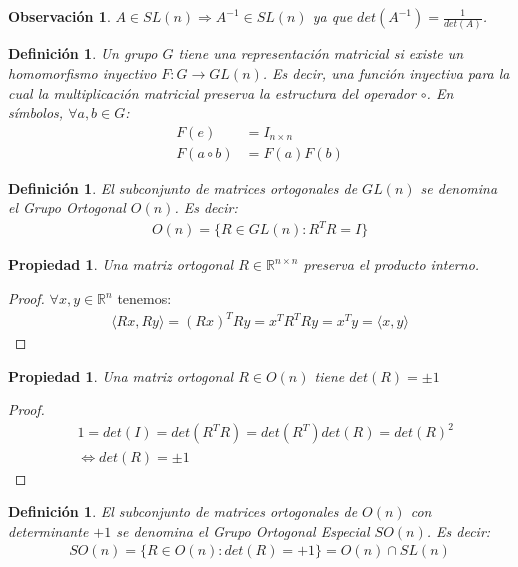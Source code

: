 \documentclass[ twoside,openright,titlepage,numbers=noenddot,%
                headinclude,footinclude,cleardoublepage=empty,abstract=on,
                BCOR=-5mm,paper=a4,fontsize=11pt
                ]{scrreprt}
\newtheorem{definition}[theorem]{Definición}
\newtheorem{remark}[theorem]{Observación}
\newtheorem{property}[theorem]{Propiedad}
\newcommand{\R}{\mathbb{R}}
\newcommand{\Rnn}{\R^{n \times n}}
\newcommand{\dotprod}[2]{\langle #1, #2 \rangle}
\begin{document}
\begin{remark}\(A \in SL(n) \Rightarrow A^{-1} \in SL(n)\) ya que
\(det(A^{-1}) = \frac{1}{det(A)}\).\end{remark}

\begin{definition}Un grupo \(G\) tiene una representación matricial si
existe un homomorfismo inyectivo \(F:G \rightarrow GL(n)\). Es decir,
una función inyectiva para la cual la multiplicación matricial preserva
la estructura del operador \(\circ\). En símbolos,
\(\forall a, b \in G\): \begin{align}
  F(e) &= I_{n \times n} \\
  F(a \circ b) &= F(a)F(b)
\end{align}\end{definition}

\begin{definition}El subconjunto de matrices ortogonales de \(GL(n)\) se
denomina el Grupo Ortogonal \(O(n)\). Es decir: \begin{align}
O(n) = \{ R \in GL(n) : R^T R = I \}
\end{align}\end{definition}

\begin{property}Una matriz ortogonal \(R \in \Rnn\) preserva el producto
interno.\end{property}

\begin{proof}\(\forall x, y \in \R^{n}\) tenemos: \begin{align}
\dotprod{Rx}{Ry} = (Rx)^T Ry = x^T R^T R y = x^T y = \dotprod{x}{y}
\end{align}\end{proof}

\begin{property}Una matriz ortogonal \(R \in O(n)\) tiene
\(det(R) = \pm 1\)\end{property}

\begin{proof}\begin{align}
& 1 = det(I) = det(R^T R) = det(R^T) det(R) = det(R)^2 \\
& \Leftrightarrow det(R) = \pm 1
\end{align}\end{proof}

\begin{definition}El subconjunto de matrices ortogonales de \(O(n)\) con
determinante \(+1\) se denomina el Grupo Ortogonal Especial \(SO(n)\).
Es decir: \begin{align}
  SO(n) = \{ R \in O(n) : det(R) = +1 \} = O(n) \cap SL(n)
\end{align}\end{definition}
\end{document}
